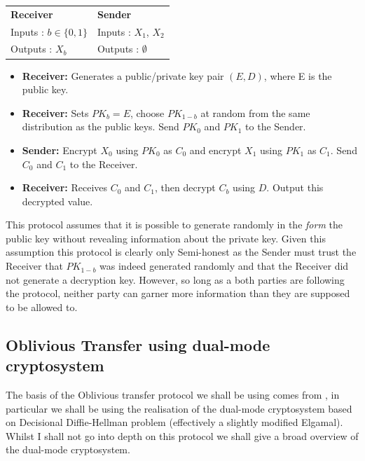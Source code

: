 \documentclass[a4paper,10pt]{article}
\begin{document}
				\begin{tabular}[!htb]{p{6cm} p{6cm}}
					\textbf{Receiver} & \textbf{Sender}\\
						Inputs : $b \in \{0, 1\}$ & Inputs : $X_1$, $X_2$\\
					Outputs : $X_b$ & Outputs : $\emptyset$\\
				\end{tabular}

				\begin{itemize}
					\setlength{\itemsep}{0.5pt}
					\setlength{\parskip}{0pt}
					\setlength{\parsep}{0pt}

					\item \textbf{Receiver:} Generates a public/private key pair $(E, D)$, where E is the public key.\\
					\item \textbf{Receiver:} Sets $PK_b = E$, choose $PK_{1-b}$ at random from the same distribution as the public keys. Send $PK_0$ and $PK_1$ to the Sender.\\
					\item \textbf{Sender:} Encrypt $X_0$ using $PK_0$ as $C_0$ and encrypt $X_1$ using $PK_1$ as $C_1$. Send $C_0$ and $C_1$ to the Receiver.\\
					\item \textbf{Receiver:} Receives $C_0$ and $C_1$, then decrypt $C_b$ using $D$. Output this decrypted value.
				\end{itemize}

				This protocol assumes that it is possible to generate randomly in the \emph{form} the public key without revealing information about the private key. Given this assumption this protocol is clearly only Semi-honest as the Sender must trust the Receiver that $PK_{1-b}$ was indeed generated randomly and that the Receiver did not generate a decryption key. However, so long as a both parties are following the protocol, neither party can garner more information than they are supposed to be allowed to.
 
		\subsection{Oblivious Transfer using dual-mode cryptosystem} \label{dualModeCryptoOT}
			The basis of the Oblivious transfer protocol we shall be using comes from \cite{PVW_OT_2008}, in particular we shall be using the realisation of the dual-mode cryptosystem based on Decisional Diffie-Hellman problem (effectively a slightly modified Elgamal). Whilst I shall not go into depth on this protocol we shall give a broad overview of the dual-mode cryptosystem.\\
\end{document}

